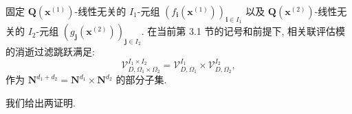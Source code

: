 \begin{lemma}\label{lem:3.1.9}
固定 \(\mathbf{Q}(\mathbf{x}^{(1)})\)-线性无关的 \(I_1\)-元组 \((f_{\mathbf{i}}(\mathbf{x}^{(1)}))_{\mathbf{i} \in I_1}\) 以及 \(\mathbf{Q}(\mathbf{x}^{(2)})\)-线性无关的 \(I_2\)-元组 \((g_{\mathbf{j}}(\mathbf{x}^{(2)}))_{\mathbf{j} \in I_2}\). 
在当前第 3.1 节的记号和前提下, 相关联评估模的消逝过滤跳跃满足:
\begin{equation}\label{eq:3.1.10}
\mathcal{V}_{D,\Omega_{1}\times\Omega_{2}}^{I_{1}\times I_{2}} = \mathcal{V}_{D,\Omega_{1}}^{I_{1}} \times \mathcal{V}_{D,\Omega_{2}}^{I_{2}},
\end{equation}
作为 \(\mathbf{N}^{d_1+d_2} = \mathbf{N}^{d_1} \times \mathbf{N}^{d_2}\) 的部分子集.
\end{lemma}

我们给出两证明.

